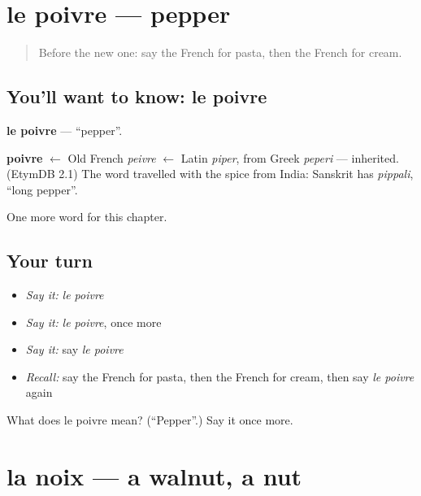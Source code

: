 \section[le poivre]{le poivre — pepper}

\label{lesson:FR-C72-poivre}



\begin{quote}
Before the new one: say the French for pasta, then the French for cream.
\end{quote}

\subsection*{You'll want to know: le poivre}
\textbf{le poivre} — \textquotedblleft{}pepper\textquotedblright{}.

\begin{cousinweb}
\textbf{poivre} $\leftarrow$ Old French \emph{peivre} $\leftarrow$ Latin \emph{piper}, from Greek \emph{peperi} — inherited. (EtymDB 2.1) The word travelled with the spice from India: Sanskrit has \emph{pippali}, \textquotedblleft{}long pepper\textquotedblright{}.
\end{cousinweb}

\begin{grammarlens}[title={What you've built}]
One more word for this chapter.
\end{grammarlens}

\subsection*{Your turn}
\begin{itemize}
\raggedright
  \item \emph{Say it:} \emph{le poivre}
  \item \emph{Say it:} \emph{le poivre}, once more
  \item \emph{Say it:} say \emph{le poivre}
  \item \emph{Recall:} say the French for pasta, then the French for cream, then say \emph{le poivre} again
\end{itemize}

\begin{tcolorbox}[breakable,colback=teal!4,colframe=teal!35!black,title={Before you move on}]
What does le poivre mean? (\textquotedblleft{}Pepper\textquotedblright{}.) Say it once more.
\end{tcolorbox}
\section[la noix]{la noix — a walnut, a nut}

